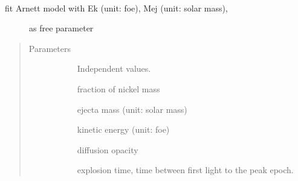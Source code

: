 \documentclass[letterpaper,10pt,english]{sphinxmanual}
\begin{document}
\begin{fulllineitems}
\label{\detokenize{generated/sdapy.models.arnett_tail.Arnett_fit_Mej_Ek:sdapy.models.arnett_tail.Arnett_fit_Mej_Ek}}~\begin{description}
\item[{fit Arnett model with Ek (unit: foe), Mej (unit: solar mass),}] \leavevmode
as free parameter

\end{description}
\begin{quote}\begin{description}
\item[{Parameters}] \leavevmode\begin{description}
\item[{}] \leavevmode{[}\sphinxtitleref{array}{]}
Independent values.

\item[{}] \leavevmode{[}\sphinxtitleref{float}{]}
fraction of nickel mass

\item[{}] \leavevmode{[}\sphinxtitleref{float}{]}
ejecta mass (unit: solar mass)

\item[{}] \leavevmode{[}\sphinxtitleref{float}{]}
kinetic energy (unit: foe)

\item[{}] \leavevmode{[}\sphinxtitleref{float}{]}
diffusion opacity

\item[{}] \leavevmode{[}\sphinxtitleref{float}{]}
explosion time, time between first light to the peak epoch.

\end{description}

\end{description}\end{quote}

\end{fulllineitems}


\end{document}
